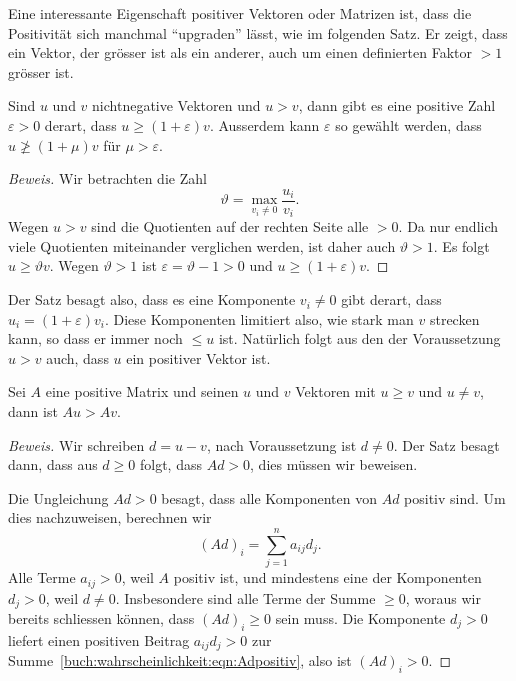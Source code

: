 Eine interessante Eigenschaft positiver Vektoren oder Matrizen
ist, dass die Positivität sich manchmal ``upgraden'' lässt, 
wie im folgenden Satz.
Er zeigt, dass ein Vektor, der grösser ist als ein anderer, auch
um einen definierten Faktor $>1$ grösser ist.

\begin{satz}[Trenntrick]
\label{buch:wahrscheinlichkeit:satz:trenntrick}
Sind $u$ und $v$ nichtnegative Vektoren und $u>v$, dann gibt es eine
positive Zahl $\varepsilon>0$ derart, dass
$u\ge (1+\varepsilon)v$.
Ausserdem kann $\varepsilon$ so gewählt werden, dass $u\not\ge(1+\mu)v$
für $\mu>\varepsilon$.
\end{satz}

\begin{proof}[Beweis]
Wir betrachten die Zahl
\[
\vartheta
=
\max_{v_i\ne 0} \frac{u_i}{v_i}.
\]
Wegen $u>v$ sind die Quotienten auf der rechten Seite alle $>0$.
Da nur endlich viele Quotienten miteinander verglichen werden, ist
daher auch $\vartheta >1$.
Es folgt $u\ge \vartheta v$. 
Wegen $\vartheta >1$ ist $\varepsilon = \vartheta -1 >0$ und
$u\ge (1+\varepsilon)v$.
\end{proof}

Der Satz besagt also, dass es eine Komponente $v_i\ne 0$ gibt
derart, dass $u_i = (1+\varepsilon)v_i$.
Diese Komponenten limitiert also, wie stark man $v$ strecken kann,
so dass er immer noch $\le u$ ist.
Natürlich folgt aus den der Voraussetzung $u>v$ auch, dass $u$ ein 
positiver Vektor ist.

\begin{satz}[Vergleichstrick]
\label{buch:wahrscheinlichkeit:satz:vergleichstrick}
Sei $A$ eine positive Matrix und seinen $u$ und $v$ Vektoren
mit $u\ge v$ und $u\ne v$, dann ist $Au > Av$.
\end{satz}

\begin{proof}[Beweis]
Wir schreiben $d=u-v$, nach Voraussetzung ist $d\ne 0$.
Der Satz besagt dann, dass aus $d\ge 0$ folgt, dass $Ad>0$, dies
müssen wir beweisen.

Die Ungleichung $Ad>0$ besagt, dass alle Komponenten von $Ad$ 
positiv sind.
Um dies nachzuweisen, berechnen wir
\begin{equation}
(Ad)_i
=
\sum_{j=1}^n
a_{ij}
d_j.
\label{buch:wahrscheinlichkeit:eqn:Adpositiv}
\end{equation}
Alle Terme $a_{ij}>0$, weil $A$ positiv ist, und mindestens eine
der Komponenten $d_j>0$, weil $d\ne 0$.
Insbesondere sind alle Terme der Summe $\ge 0$, woraus wir
bereits schliessen können, dass $(Ad)_i\ge 0$ sein muss.
Die Komponente $d_j>0$ liefert einen positiven Beitrag
$a_{ij}d_j>0$
zur Summe~\eqref{buch:wahrscheinlichkeit:eqn:Adpositiv},
also ist $(Ad)_i>0$.
\end{proof}


